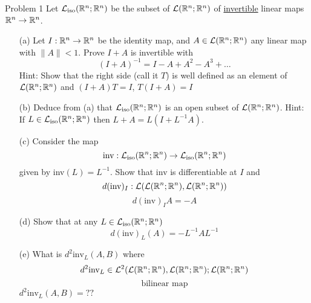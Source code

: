 \documentclass{hmwk}
\begin{document}
\maketitle

\begin{problem}{Problem 1}
Let $\mathcal{L}_{\text{iso}}(\mathbb{R}^n; \mathbb{R}^n)$ be the subset of $\mathcal{L}(\mathbb{R}^n; \mathbb{R}^n)$ of \underline{invertible} linear maps $\mathbb{R}^n \rightarrow \mathbb{R}^n$.
\begin{itemize}
    \item[(a)] Let $I: \mathbb{R}^n \rightarrow \mathbb{R}^n$ be the identity map, and $A \in \mathcal{L}(\mathbb{R}^n ; \mathbb{R}^n)$ any linear map with $\|A\| < 1$. Prove $I + A$ is invertible with $$(I + A)^{-1} = I - A + A^2 - A^3 + \dots$$ 
    Hint: Show that the right side (call it $T$) is well defined as an element of $\mathcal{L}(\mathbb{R}^n; \mathbb{R}^n)$ and $(I + A)T = I$, $T(I + A) = I$
    \item[(b)] Deduce from (a) that $\mathcal{L}_{\text{iso}}(\mathbb{R}^n; \mathbb{R}^n)$ is an open subset of $\mathcal{L}(\mathbb{R}^n; \mathbb{R}^n)$. Hint: If $L \in \mathcal{L}_{\text{iso}}(\mathbb{R}^n; \mathbb{R}^n)$ then $L + A = L(I + L^{-1}A)$. 
    \item[(c)] Consider the map
    $$\text{inv}: \mathcal{L}_{\text{iso}}(\mathbb{R}^n; \mathbb{R}^n) \rightarrow \mathcal{L}_{\text{iso}}(\mathbb{R}^n; \mathbb{R}^n)$$ given by inv$(L) = L^{-1}$.
    Show that inv is differentiable at $I$ and $$d(\text{inv})_I: \mathcal{L}(\mathcal{L}(\mathbb{R}^n; \mathbb{R}^n), \mathcal{L}(\mathbb{R}^n; \mathbb{R}^n))$$ 
    $$d(\text{inv})_IA = -A$$
    \item[(d)] Show that at any $L \in \mathcal{L}_{\text{iso}}(\mathbb{R}^n; \mathbb{R}^n)$
    $$d(\text{inv})_L(A) = -L^{-1}AL^{-1}$$
    \item[(e)] What is $d^2\text{inv}_L(A, B)$ where $$d^2\text{inv}_L \in \mathcal{L}^2(\mathcal{L}(\mathbb{R}^n;\mathbb{R}^n), \mathcal{L}(\mathbb{R}^n;\mathbb{R}^n); \mathcal{L}(\mathbb{R}^n;\mathbb{R}^n)$$
    $$\text{bilinear map}$$
    $d^2\text{inv}_L(A, B) = ??$
\end{itemize}
\end{problem}
\end{document}
